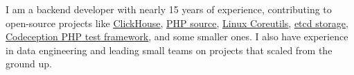 I am a backend developer with nearly 15 years of experience, contributing to
open-source projects like
\href{https://github.com/ClickHouse/ClickHouse/pulls?q=is\%3Apr+is\%3Aclosed+author\%3AGSokol}{\underline{ClickHouse}},
\href{https://github.com/php/php-src/pulls?q=is\%3Apr+is\%3Aclosed+author\%3AGSokol}{\underline{PHP source}},
\href{https://github.com/coreutils/coreutils/commits?author=GSokol}{\underline{Linux Coreutils}},
\href{https://github.com/etcd-io/etcd/pulls?q=is\%3Apr+is\%3Aclosed+author\%3AGSokol}{\underline{etcd storage}},
\href{https://github.com/Codeception/Codeception/pulls?q=is\%3Apr+is\%3Aclosed+author\%3AGSokol}{\underline{Codeception PHP test framework}},
and some smaller ones. I also have experience in data engineering and leading
small teams on projects that scaled from the ground up.

